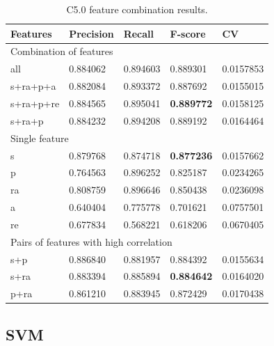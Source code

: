 \begin{table}[h]
\centering
\caption{C5.0 feature combination results.}
\label{tab:c50featcombres}
\begin{tabular}{ | l | l | l | l | l |}
\hline
Features & Precision & Recall & F-score & CV \\
\hline
\multicolumn{5}{|l|}{Combination of features} \\
\hline
all      & 0.884062 & 0.894603 & 0.889301 & 0.0157853  \\
s+ra+p+a & 0.882084 & 0.893372 & 0.887692 & 0.0155015  \\
s+ra+p+re& 0.884565 & 0.895041 & \textbf{0.889772} & 0.0158125  \\
s+ra+p   & 0.884232 & 0.894208 & 0.889192 & 0.0164464  \\
\hline
\multicolumn{5}{|l|}{Single feature} \\
\hline
s        & 0.879768 & 0.874718 & \textbf{0.877236} & 0.0157662  \\
p        & 0.764563 & 0.896252 & 0.825187 & 0.0234265  \\
ra       & 0.808759 & 0.896646 & 0.850438 & 0.0236098  \\
a        & 0.640404 & 0.775778 & 0.701621 & 0.0757501  \\
re       & 0.677834 & 0.568221 & 0.618206 & 0.0670405  \\
\hline
\multicolumn{5}{|l|}{Pairs of features with high correlation} \\
\hline
s+p      &  0.886840 & 0.881957 & 0.884392 & 0.0155634 \\
s+ra     & 0.883394 & 0.885894 & \textbf{0.884642} & 0.0164020 \\
p+ra     & 0.861210 & 0.883945 & 0.872429 & 0.0170438 \\
\hline
\end{tabular}
\end{table}

\subsection{SVM}\label{ss:svm}

